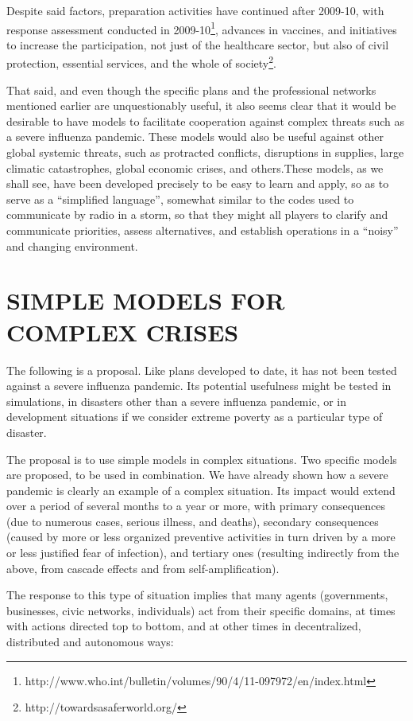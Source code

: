 \documentclass[12pt, a4]{scrartcl}
\begin{document}
Despite said factors, preparation activities have continued after 2009-10, with response assessment conducted in 2009-10\footnote{http://www.who.int/bulletin/volumes/90/4/11-097972/en/index.html}, advances in vaccines, and initiatives to increase the participation, not just of the healthcare sector, but also of civil protection, essential services, and the whole of society\footnote{http://towardsasaferworld.org/}.

That said, and even though the specific plans and the professional networks mentioned earlier are unquestionably useful, it also seems clear that it would be desirable to have models to facilitate cooperation against complex threats such as a severe influenza pandemic. These models would also be useful against other global systemic threats, such as protracted conflicts, disruptions in supplies, large climatic catastrophes, global economic crises, and others.These models, as we shall see, have been developed precisely to be easy to learn and apply, so as to serve as a “simplified language”, somewhat similar to the codes used to communicate by radio in a storm, so that they might all players to clarify and communicate priorities, assess alternatives, and establish operations in a “noisy” and changing environment.

\newpage
\section {SIMPLE MODELS FOR COMPLEX CRISES}
The following is a proposal. Like plans developed to date, it has not been tested against a severe influenza pandemic. Its potential usefulness might be tested in simulations, in disasters other than a severe influenza pandemic, or in development situations if we consider extreme poverty as a particular type of disaster.

The proposal is to use simple models in complex situations. Two specific models are proposed, to be used in combination. We have already shown how a severe pandemic is clearly an example of a complex situation. Its impact would extend over a period of several months to a year or more, with primary consequences (due to numerous cases, serious illness, and deaths), secondary consequences (caused by more or less organized preventive activities in turn driven by a more or less justified fear of infection), and tertiary ones (resulting indirectly from the above, from cascade effects and from self-amplification). 

The response to this type of situation implies that many agents (governments, businesses, civic networks, individuals) act from their specific domains, at times with actions directed top to bottom, and at other times in decentralized, distributed and autonomous ways:
\end{document}
